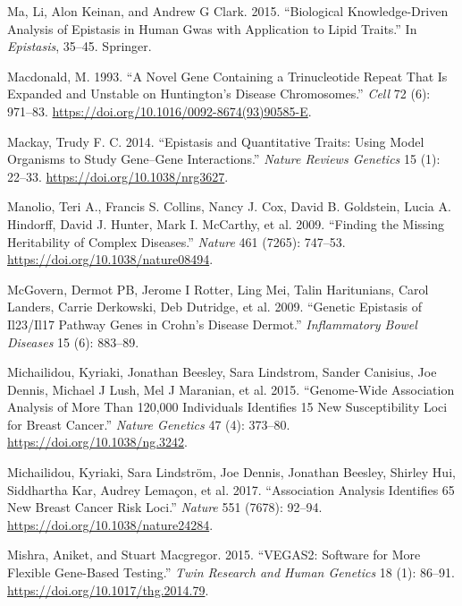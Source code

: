 \documentclass[
  11pt,
]{env/yjiao}
\newlength{\cslhangindent}
\newenvironment{cslreferences}%
  {\setlength{\parindent}{0pt}%
  \everypar{\setlength{\hangindent}{\cslhangindent}}\ignorespaces}%
  {\par}
\begin{document}
\begin{cslreferences}
\leavevmode\hypertarget{ref-ma2015biological}{}%
Ma, Li, Alon Keinan, and Andrew G Clark. 2015. ``Biological Knowledge-Driven Analysis of Epistasis in Human Gwas with Application to Lipid Traits.'' In \emph{Epistasis}, 35--45. Springer.

\leavevmode\hypertarget{ref-macdonald_novel_1993}{}%
Macdonald, M. 1993. ``A Novel Gene Containing a Trinucleotide Repeat That Is Expanded and Unstable on Huntington's Disease Chromosomes.'' \emph{Cell} 72 (6): 971--83. \url{https://doi.org/10.1016/0092-8674(93)90585-E}.

\leavevmode\hypertarget{ref-mackay_epistasis_2014}{}%
Mackay, Trudy F. C. 2014. ``Epistasis and Quantitative Traits: Using Model Organisms to Study Gene--Gene Interactions.'' \emph{Nature Reviews Genetics} 15 (1): 22--33. \url{https://doi.org/10.1038/nrg3627}.

\leavevmode\hypertarget{ref-manolio_finding_2009}{}%
Manolio, Teri A., Francis S. Collins, Nancy J. Cox, David B. Goldstein, Lucia A. Hindorff, David J. Hunter, Mark I. McCarthy, et al. 2009. ``Finding the Missing Heritability of Complex Diseases.'' \emph{Nature} 461 (7265): 747--53. \url{https://doi.org/10.1038/nature08494}.

\leavevmode\hypertarget{ref-mcgovern2009genetic}{}%
McGovern, Dermot PB, Jerome I Rotter, Ling Mei, Talin Haritunians, Carol Landers, Carrie Derkowski, Deb Dutridge, et al. 2009. ``Genetic Epistasis of Il23/Il17 Pathway Genes in Crohn's Disease Dermot.'' \emph{Inflammatory Bowel Diseases} 15 (6): 883--89.

\leavevmode\hypertarget{ref-michailidou_genome-wide_2015}{}%
Michailidou, Kyriaki, Jonathan Beesley, Sara Lindstrom, Sander Canisius, Joe Dennis, Michael J Lush, Mel J Maranian, et al. 2015. ``Genome-Wide Association Analysis of More Than 120,000 Individuals Identifies 15 New Susceptibility Loci for Breast Cancer.'' \emph{Nature Genetics} 47 (4): 373--80. \url{https://doi.org/10.1038/ng.3242}.

\leavevmode\hypertarget{ref-michailidou_association_2017}{}%
Michailidou, Kyriaki, Sara Lindström, Joe Dennis, Jonathan Beesley, Shirley Hui, Siddhartha Kar, Audrey Lemaçon, et al. 2017. ``Association Analysis Identifies 65 New Breast Cancer Risk Loci.'' \emph{Nature} 551 (7678): 92--94. \url{https://doi.org/10.1038/nature24284}.

\leavevmode\hypertarget{ref-mishra_vegas2:_2015}{}%
Mishra, Aniket, and Stuart Macgregor. 2015. ``VEGAS2: Software for More Flexible Gene-Based Testing.'' \emph{Twin Research and Human Genetics} 18 (1): 86--91. \url{https://doi.org/10.1017/thg.2014.79}.


\end{cslreferences}
\end{document}

